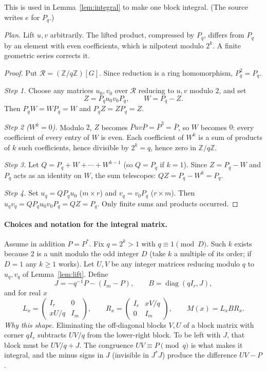 \documentclass[11pt]{article}
\theoremstyle{remark}
\numberwithin{equation}{section}
\newcommand{\Z}{\mathbb Z}
\newcommand{\diag}{\operatorname{diag}}
\begin{document}
This is used in Lemma~\ref{lem:integral} to make one block integral. (The source writes $e$ for $P_q$.)

\emph{Plan.} Lift $u,v$ arbitrarily. The lifted product, compressed by $P_q$, differs from $P_q$ by an element with even coefficients, which is nilpotent modulo $2^k$. A finite geometric series corrects it.

\begin{proof}
Put $\mathcal R=(\Z/q\Z)[G]$. Since reduction is a ring homomorphism, $P_q^2=P_q$.

\emph{Step 1.} Choose any matrices $u_0,v_0$ over $\mathcal R$ reducing to $u,v$ modulo $2$, and set
\[
 Z=P_qu_0v_0P_q,\qquad W=P_q-Z .
\]
Then $P_qW=WP_q=W$ and $P_qZ=ZP_q=Z$.

\emph{Step 2 ($W^k=0$).} Modulo $2$, $Z$ becomes $\bar Puv\bar P=\bar P^3=\bar P$, so $W$ becomes $0$: every coefficient of every entry of $W$ is even. Each coefficient of $W^k$ is a sum of products of $k$ such coefficients, hence divisible by $2^k=q$, hence zero in $\Z/q\Z$.

\emph{Step 3.} Let $Q=P_q+W+\cdots+W^{k-1}$ (so $Q=P_q$ if $k=1$). Since $Z=P_q-W$ and $P_q$ acts as an identity on $W$, the sum telescopes: $QZ=P_q-W^k=P_q$.

\emph{Step 4.} Set $u_q=QP_qu_0$ ($m\times r$) and $v_q=v_0P_q$ ($r\times m$). Then $u_qv_q=QP_qu_0v_0P_q=QZ=P_q$. Only finite sums and products occurred.
\end{proof}

\paragraph{Choices and notation for the integral matrix.} Assume in addition $P=P^*$. Fix $q=2^k>1$ with $q\equiv1\pmod D$. Such $k$ exists because $2$ is a unit modulo the odd integer $D$ (take $k$ a multiple of its order; if $D=1$ any $k\ge1$ works). Let $U,V$ be any integer matrices reducing modulo $q$ to $u_q,v_q$ of Lemma~\ref{lem:lift}. Define
\[
 J=-q^{-1}P-(I_m-P),\qquad B=\diag(qI_r,J),
\]
and for real $x$
\[
 L_x=\begin{pmatrix}I_r&0\\xU/q&I_m\end{pmatrix},\qquad
 R_x=\begin{pmatrix}I_r&xV/q\\0&I_m\end{pmatrix},\qquad M(x)=L_xBR_x .
\]
\emph{Why this shape.} Eliminating the off-diagonal blocks $V,U$ of a block matrix with corner $qI_r$ subtracts $UV/q$ from the lower-right block. To be left with $J$, that block must be $UV/q+J$. The congruence $UV\equiv P\pmod q$ is what makes it integral, and the minus signs in $J$ (invisible in $J^*J$) produce the difference $UV-P$.
\end{document}

